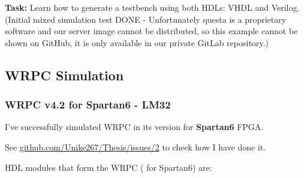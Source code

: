 \vspace{5mm}

\noindent \textbf{Task:} Learn how to generate a testbench using both HDLs: VHDL and Verilog.
(Initial mixed simulation test DONE - Unfortunately questa is a proprietary software and our server image cannot be distributed, so this example cannot be shown on GitHub, it is only available in our private GitLab repository.)

\newpage

\subsection{WRPC Simulation}

\subsubsection{WRPC v4.2 for Spartan6 - LM32}
\label{list-wrpc}

I've successfully simulated WRPC \cite{WRPC:ohwr} in its  version for \textbf{Spartan6} FPGA.

\vspace{5mm}

\noindent See \href{https://github.com/Unike267/Thesis/issues/2}{github.com/Unike267/Thesis/issues/2} to check how I have done it.

\vspace{5mm}

\noindent HDL modules that form the WRPC ( for Spartan6) are:

